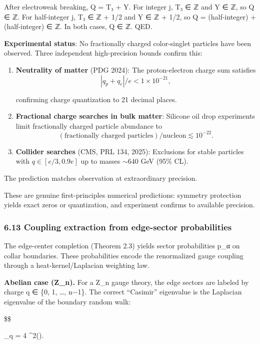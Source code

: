 \documentclass[11pt,a4paper]{article}
\theoremstyle{remark}
\begin{document}
After electroweak breaking, Q = T₃ + Y. For integer j, T₃ ∈ ℤ and Y ∈ ℤ,
so Q ∈ ℤ. For half-integer j, T₃ ∈ ℤ + 1/2 and Y ∈ ℤ + 1/2, so
Q = (half-integer) + (half-integer) ∈ ℤ. In both cases, Q ∈ ℤ. QED.

\textbf{Experimental status}: No fractionally charged color-singlet particles
have been observed. Three independent high-precision bounds confirm this:

\begin{enumerate}
\def\labelenumi{\arabic{enumi}.}
\item
  \textbf{Neutrality of matter} (PDG 2024): The proton-electron charge sum satisfies
  \[|q_p + q_e|/e < 1 \times 10^{-21},\]

  confirming charge quantization to 21 decimal places.
\item
  \textbf{Fractional charge searches in bulk matter}: Silicone oil drop experiments
  limit fractionally charged particle abundance to
  \[(\text{fractionally charged particles})/\text{nucleon} \lesssim 10^{-22}.\]
\item
  \textbf{Collider searches} (CMS, PRL 134, 2025): Exclusions for stable particles
  with \(q \in [e/3, 0.9e]\) up to masses \(\sim 640\) GeV (95\% CL).
\end{enumerate}

The prediction matches observation at extraordinary precision.

These are genuine first-principles numerical predictions: symmetry protection
yields exact zeros or quantization, and experiment confirms to available precision.

\subsubsection{6.13 Coupling extraction from edge-sector probabilities}\label{coupling-extraction-from-edge-sector-probabilities}

The edge-center completion (Theorem 2.3) yields sector probabilities p\_α
on collar boundaries. These probabilities encode the renormalized gauge
coupling through a heat-kernel/Laplacian weighting law.

\textbf{Abelian case (Z\_n).} For a Z\_n gauge theory, the edge
sectors are labeled by charge q ∈ \{0, 1, \ldots, n−1\}. The correct
``Casimir'' eigenvalue is the Laplacian eigenvalue of the boundary random walk:

\$\$

\lambda\_q = 4 \sin\^{}2\left(\right).
\end{document}
